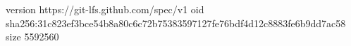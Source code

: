 version https://git-lfs.github.com/spec/v1
oid sha256:31c823ef3bce54b8a80c6c72b75383597127fe76bdf4d12c8883fe6b9dd7ac58
size 5592560
